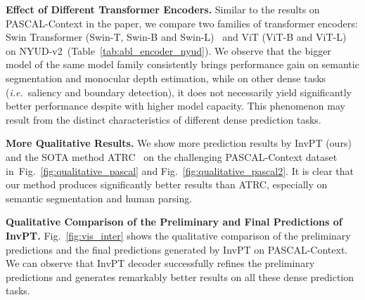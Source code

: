 \documentclass[runningheads]{llncs}
\newcommand*{\ie}{\emph{i.e.}}
\begin{document}
\par\noindent\textbf{Effect of Different Transformer Encoders.} Similar to the results on PASCAL-Context in the paper, we compare two families of transformer encoders: Swin Transformer (Swin-T, Swin-B and Swin-L)~\cite{swin} and ViT (ViT-B and ViT-L)~\cite{vit} on NYUD-v2~(Table~\ref{tab:abl_encoder_nyud}).
We observe that the bigger model of the same model family consistently brings performance gain on semantic segmentation and monocular depth estimation, while on other dense tasks (\ie~saliency and boundary detection), it does not necessarily yield significantly better performance despite with higher model capacity. This phenomenon may result from the distinct characteristics of different dense prediction tasks.


\begin{table}[t]
\centering
\caption{Performance comparison of using different transformer
encoder structures in InvPT on NYUD-v2.}
\label{tab:abl_encoder_nyud}
     \vspace{-5pt}
\end{table}


\par\noindent\textbf{More Qualitative Results.}
We show more prediction results by InvPT (ours) and the SOTA method ATRC~\cite{atrc} on the challenging PASCAL-Context dataset in~Fig.~\ref{fig:qualitative_pascal} and Fig.~\ref{fig:qualitative_pascal2}. It is clear that our method produces significantly better results than ATRC, especially on semantic segmentation and human parsing.


\par\noindent\textbf{Qualitative Comparison of the Preliminary and Final Predictions of InvPT.}
Fig.~\ref{fig:vis_inter} shows the qualitative comparison of the preliminary predictions and the final predictions generated by InvPT on PASCAL-Context. We can observe that InvPT decoder successfully refines the preliminary predictions and generates remarkably better results on all these dense prediction tasks.
\end{document}
